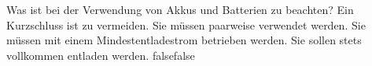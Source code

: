     {Was ist bei der Verwendung von Akkus und Batterien zu beachten?}
    {Ein Kurzschluss ist zu vermeiden.}
    {Sie müssen paarweise verwendet werden.}
    {Sie müssen mit einem Mindestentladestrom betrieben werden.}
    {Sie sollen stets vollkommen entladen werden.}
    {false}{false}